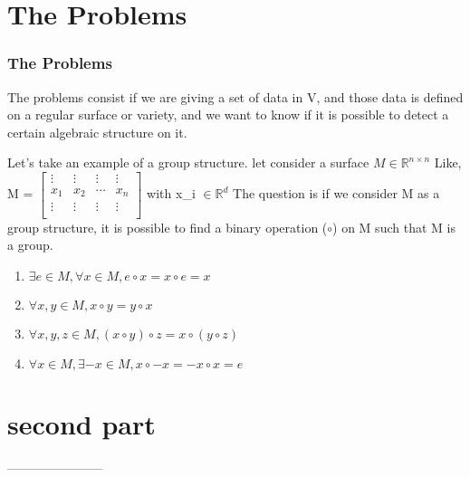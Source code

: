 \documentclass[
]{beamer}
\begin{document}


\section{The Problems}
\begin{frame}
    \frametitle{The Problems}
    The problems consist if we are giving a set of data in V, and those data is defined on a regular surface or variety, and we want to know if it is possible to detect a certain algebraic structure on it.

	Let's take an example of a group structure.
	let consider a surface $M \in \mathbb{R}^{n \times n}$
	Like, 
	M = 
	$\begin{bmatrix}
		\vdots & \vdots & \vdots &\vdots \\
		x_{1} & x_{2} & \cdots & x_{n} \\
		\vdots & \vdots & \vdots &\vdots \\
	\end{bmatrix}$
	with x_{i} $\in \mathbb{R}^{d}$
	The question is if we consider M as a group structure, it is possible to find a binary operation ($\circ$) on M such that M is a group.
	\begin{enumerate}
		\item $\exists e \in M, \forall x \in M, e \circ x = x \circ e = x$
		\item $\forall{} x,y \in{} M, x \circ y = y \circ x$
		\item $\forall x,y,z \in M, (x \circ y) \circ z = x \circ (y \circ z)$
		\item $\forall x \in M, \exists -x \in M, x \circ -x = -x \circ x = e$
	\end{enumerate}
\end{frame}

\section{second part}
\begin{frame}

\end{frame}








-----------------------
\end{document}
